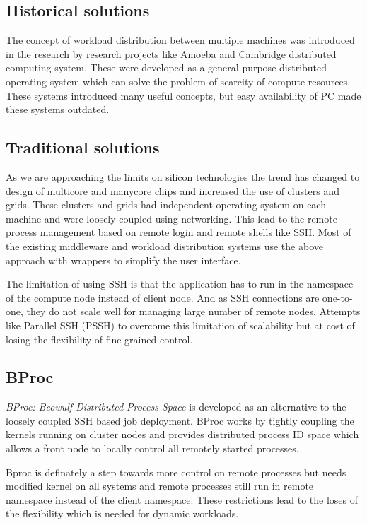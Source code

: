 \documentclass[conference]{IEEEtran}
\begin{document}
\subsection{Historical solutions}
The concept of workload distribution between multiple machines was introduced in
the research by research projects like Amoeba \cite{amoeba} and Cambridge
distributed computing system\cite{Needham82}.  These were developed as a general
purpose distributed operating system which can solve the problem of scarcity
of compute resources. These systems introduced many useful concepts, but easy
availability of PC made these systems outdated.

\subsection{Traditional solutions}
As we are approaching the limits on silicon technologies the trend has changed
to design of multicore and manycore chips and increased the use of clusters and
grids. These clusters and grids had independent operating system on each
machine and were loosely coupled using networking.  This lead to the
remote process management based on remote login and remote shells like
SSH\cite{ssh}.  Most of the existing middleware and workload distribution
systems use the above approach with wrappers to simplify the user interface.

The limitation of using SSH is that the application has to run in the
namespace of the compute node instead of client node. And as SSH connections
are one-to-one, they do not scale well for managing large number of remote
nodes.  Attempts like Parallel SSH (PSSH)\cite{pssh} to overcome this
limitation of scalability but at cost of losing the flexibility of fine grained
control.

\subsection{BProc}
\textit{BProc: Beowulf Distributed Process Space} \cite{bproc} is developed as
an alternative to the loosely coupled SSH based job deployment. BProc works by
tightly coupling the kernels running on cluster nodes and provides distributed
process ID space which allows a front node to locally control all remotely
started processes.

Bproc is definately a step towards more control on remote processes but needs
modified kernel on all systems and remote processes still run in remote
namespace instead of the client namespace. These restrictions lead to the
loses of the flexibility which is needed for dynamic workloads.
\end{document}
